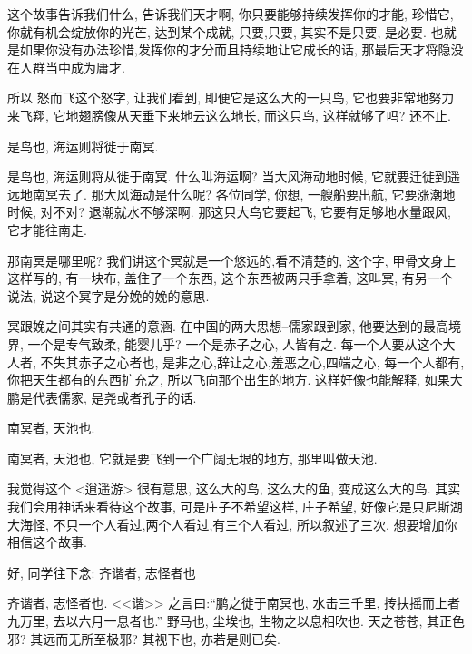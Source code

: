 \documentclass[11pt]{article}
\begin{document}
这个故事告诉我们什么, 告诉我们天才啊, 你只要能够持续发挥你的才能, 珍惜它, 你就有机会绽放你的光芒, 达到某个成就, 只要,只要, 其实不是只要, 是必要. 也就是如果你没有办法珍惜,发挥你的才分而且持续地让它成长的话, 那最后天才将隐没在人群当中成为庸才. 

所以{\color{blue} 怒而飞}这个怒字, 让我们看到, 即便它是这么大的一只鸟, 它也要非常地努力来飞翔, 它地翅膀像从天垂下来地云这么地长, 而这只鸟, 这样就够了吗? 还不止. 

\begin{center}
	{\color{magenta} 是鸟也, 海运则将徙于南冥.}
\end{center}

\vspace{-0.5cm}

{\color{blue} 是鸟也, 海运则将从徙于南冥.} 什么叫海运啊? 当大风海动地时候, 它就要迁徙到遥远地南冥去了. 那大风海动是什么呢? 各位同学, 你想, 一艘船要出航, 它要涨潮地时候, 对不对? 退潮就水不够深啊. 那这只大鸟它要起飞, 它要有足够地水量跟风, 它才能往南走.

那南冥是哪里呢? 我们讲这个冥就是一个悠远的,看不清楚的, 这个字, 甲骨文身上这样写的, 有一块布, 盖住了一个东西, 这个东西被两只手拿着, 这叫冥, 有另一个说法, 说这个冥字是分娩的娩的意思.

冥跟娩之间其实有共通的意涵. 在中国的两大思想--儒家跟到家, 他要达到的最高境界, 一个是专气致柔, 能婴儿乎? 一个是赤子之心, 人皆有之. 每一个人要从这个大人者, 不失其赤子之心者也, 是非之心,辞让之心,羞恶之心,四端之心, 每一个人都有, 你把天生都有的东西扩充之, 所以飞向那个出生的地方. 这样好像也能解释, 如果大鹏是代表儒家, 是尧或者孔子的话.

\begin{center}
	{\color{magenta} 南冥者, 天池也.}
\end{center}

\vspace{-0.5cm}

{\color{blue} 南冥者, 天池也}, 它就是要飞到一个广阔无垠的地方, 那里叫做天池.

我觉得这个 <逍遥游> 很有意思, 这么大的鸟, 这么大的鱼, 变成这么大的鸟. 其实我们会用神话来看待这个故事, 可是庄子不希望这样, 庄子希望, 好像它是只尼斯湖大海怪, 不只一个人看过,两个人看过,有三个人看过, 所以叙述了三次, 想要增加你相信这个故事.

好, 同学往下念: {\color{blue} 齐谐者, 志怪者也}

{\color{blue} 齐谐者, 志怪者也. <<谐>> 之言曰:“鹏之徙于南冥也, 水击三千里, 抟扶摇而上者九万里, 去以六月一息者也.”  野马也, 尘埃也, 生物之以息相吹也. 天之苍苍, 其正色邪? 其远而无所至极邪? 其视下也, 亦若是则已矣.}
\end{document}
